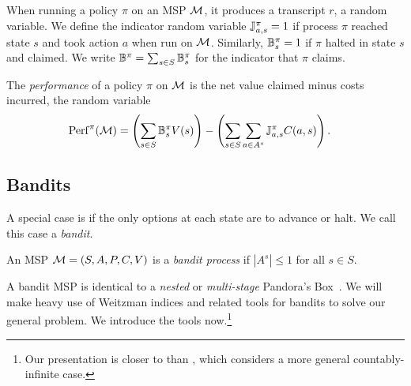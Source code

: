 When running a policy $\pi$ on an MSP $\mathcal{M}$, it produces a transcript $r$, a random variable.
We define the indicator random variable $\mathbb{J}^{\pi}_{a,s} = 1$ if process $\pi$ reached state $s$ and took action $a$ when run on $\mathcal{M}$.
Similarly, $\mathbb{B}^{\pi}_{s} = 1$ if $\pi$ halted in state $s$ and claimed.
We write $\mathbb{B}^{\pi} = \sum_{s \in S} \mathbb{B}^{\pi}_{s}$ for the indicator that $\pi$ claims.

The \emph{performance} of a policy $\pi$ on $\mathcal{M}$ is the net value claimed minus costs incurred, the random variable
\begin{align*}
	\mathrm{Perf}^{\pi}(\mathcal{M})
	&= \left( \sum_{s \in S} \mathbb{B}^{\pi}_{s} V(s) \right) - \left( \sum_{s \in S} \sum_{a \in A^s} \mathbb{J}^{\pi}_{a,s} C(a,s) \right) .
\end{align*}





\subsection{Bandits} \label{subsec:multistage}

A special case is if the only options at each state are to advance or halt.
We call this case a \emph{bandit}.
\begin{definition}[Bandit] \label{def:bandit}
  An MSP $\mathcal{M} = (S,A,P,C,V)$ is a \emph{bandit process} if $|A^s| \leq 1$ for all $s \in S$.
\end{definition}
A bandit MSP is identical to a \emph{nested} or \emph{multi-stage} Pandora's Box~\citep{kleinberg2016descending}.
We will make heavy use of Weitzman indices and related tools for bandits to solve our general problem.
We introduce the tools now.\footnote{Our presentation is closer to \citet{bowers2024matching} than \citet{kleinberg2016descending}, which considers a more general countably-infinite case.}


